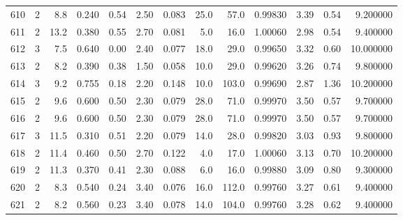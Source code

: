 \begin{tabular}{lrrrrrrrrrrrr}
610  &        2 &            8.8 &             0.240 &         0.54 &            2.50 &      0.083 &                 25.0 &                  57.0 &  0.99830 &  3.39 &       0.54 &   9.200000 \\
611  &        2 &           13.2 &             0.380 &         0.55 &            2.70 &      0.081 &                  5.0 &                  16.0 &  1.00060 &  2.98 &       0.54 &   9.400000 \\
612  &        3 &            7.5 &             0.640 &         0.00 &            2.40 &      0.077 &                 18.0 &                  29.0 &  0.99650 &  3.32 &       0.60 &  10.000000 \\
613  &        2 &            8.2 &             0.390 &         0.38 &            1.50 &      0.058 &                 10.0 &                  29.0 &  0.99620 &  3.26 &       0.74 &   9.800000 \\
614  &        3 &            9.2 &             0.755 &         0.18 &            2.20 &      0.148 &                 10.0 &                 103.0 &  0.99690 &  2.87 &       1.36 &  10.200000 \\
615  &        2 &            9.6 &             0.600 &         0.50 &            2.30 &      0.079 &                 28.0 &                  71.0 &  0.99970 &  3.50 &       0.57 &   9.700000 \\
616  &        2 &            9.6 &             0.600 &         0.50 &            2.30 &      0.079 &                 28.0 &                  71.0 &  0.99970 &  3.50 &       0.57 &   9.700000 \\
617  &        3 &           11.5 &             0.310 &         0.51 &            2.20 &      0.079 &                 14.0 &                  28.0 &  0.99820 &  3.03 &       0.93 &   9.800000 \\
618  &        2 &           11.4 &             0.460 &         0.50 &            2.70 &      0.122 &                  4.0 &                  17.0 &  1.00060 &  3.13 &       0.70 &  10.200000 \\
619  &        2 &           11.3 &             0.370 &         0.41 &            2.30 &      0.088 &                  6.0 &                  16.0 &  0.99880 &  3.09 &       0.80 &   9.300000 \\
620  &        2 &            8.3 &             0.540 &         0.24 &            3.40 &      0.076 &                 16.0 &                 112.0 &  0.99760 &  3.27 &       0.61 &   9.400000 \\
621  &        2 &            8.2 &             0.560 &         0.23 &            3.40 &      0.078 &                 14.0 &                 104.0 &  0.99760 &  3.28 &       0.62 &   9.400000 \\

\end{tabular}
